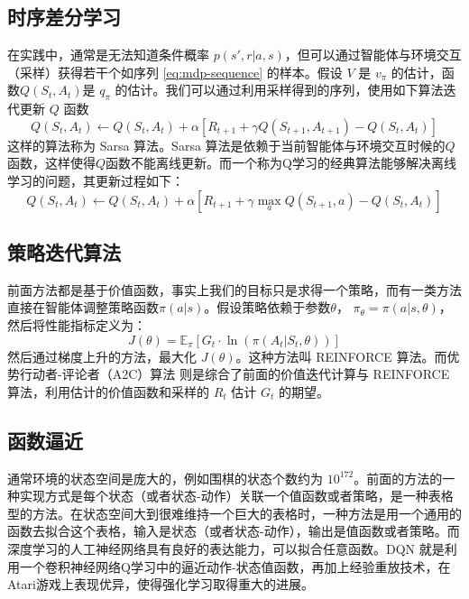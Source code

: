 \subsection{时序差分学习}
在实践中，通常是无法知道条件概率 $p(s', r | a, s)$，但可以通过智能体与环境交互（采样）获得若干个如序列 \ref{eq:mdp-sequence} 的样本。假设 $V$ 是 $v_\pi$ 的估计，函数$Q(S_t, A_t)$是 $q_\pi$ 的估计。我们可以通过利用采样得到的序列，使用如下算法迭代更新 $Q$ 函数
\begin{equation}
    Q(S_t, A_t) \leftarrow Q(S_t, A_t) + \alpha \left[ R_{t+1} + \gamma Q(S_{t+1}, A_{t+1}) - Q(S_t, A_t) \right]
\end{equation}
这样的算法称为 Sarsa 算法\cite{suttonReinforcementLearningIntroduction2018}。Sarsa 算法是依赖于当前智能体与环境交互时候的$Q$函数，这样使得$Q$函数不能离线更新。而一个称为Q学习\cite{watkinsQlearning1992}的经典算法能够解决离线学习的问题，其更新过程如下：
\begin{equation}
    Q(S_t, A_t) \leftarrow Q(S_t, A_t) + \alpha \left[ R_{t+1} + \gamma \max_{a} Q(S_{t+1}, a) - Q(S_t, A_t) \right]
\end{equation}


\subsection{策略迭代算法}
前面方法都是基于价值函数，事实上我们的目标只是求得一个策略，而有一类方法直接在智能体调整策略函数$\pi(a|s)$。假设策略依赖于参数$\theta$， $\pi_\theta = \pi(a|s,\theta)$，然后将性能指标定义为：
\begin{equation}
    J(\theta) = \mathbb{E}_\pi \left[ G_t \cdot  \ln(\pi(A_t|S_t, \theta))  \right]
\end{equation}
然后通过梯度上升的方法，最大化 $J(\theta)$。这种方法叫 REINFORCE 算法。而优势行动者-评论者（A2C）算法 \cite{mnihAsynchronousMethodsDeep2016} 则是综合了前面的价值迭代计算与 REINFORCE 算法，利用估计的价值函数和采样的 $R_t$ 估计 $G_t$ 的期望。


\subsection{函数逼近}
通常环境的状态空间是庞大的，例如围棋的状态个数约为 $10^{172}$。前面的方法的一种实现方式是每个状态（或者状态-动作）关联一个值函数或者策略，是一种表格型的方法。在状态空间大到很难维持一个巨大的表格时，一种方法是用一个通用的函数去拟合这个表格，输入是状态（或者状态-动作），输出是值函数或者策略。而深度学习的人工神经网络具有良好的表达能力，可以拟合任意函数。DQN \cite{mnihPlayingAtariDeep2013} \cite{mnihHumanlevelControlDeep2015} 就是利用一个卷积神经网络Q学习中的逼近动作-状态值函数，再加上经验重放技术，在Atari游戏上表现优异，使得强化学习取得重大的进展。



